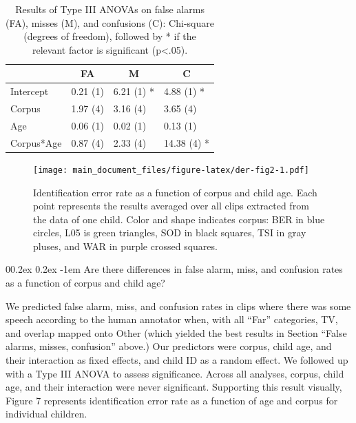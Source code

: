 \documentclass[english,table,man,floatsintext]{apa6}
\makeatletter
\let\oldparagraph\paragraph
\renewcommand{\paragraph}[1]{\oldparagraph{#1}\mbox{}}
\renewcommand{\paragraph}{\@startsection{paragraph}{4}{\parindent}%
  {0\baselineskip \@plus 0.2ex \@minus 0.2ex}%
  {-1em}%
  {\normalfont\normalsize\bfseries\itshape\typesectitle}}
\makeatother
\begin{document}
\begin{table}[tbp]

\begin{center}
\begin{threeparttable}

\caption{\label{tab:anovatab}Results of Type III ANOVAs on false alarms (FA), misses (M), and confusions (C): Chi-square (degrees of freedom), followed by * if the relevant factor is significant (p<.05).}

\begin{tabular}{llll}
\toprule
 & \multicolumn{1}{c}{FA} & \multicolumn{1}{c}{M} & \multicolumn{1}{c}{C}\\
\midrule
Intercept & 0.21 (1) & 6.21 (1) * & 4.88 (1) *\\
Corpus & 1.97 (4) & 3.16 (4) & 3.65 (4)\\
Age & 0.06 (1) & 0.02 (1) & 0.13 (1)\\
Corpus*Age & 0.87 (4) & 2.33 (4) & 14.38 (4) *\\
\bottomrule
\end{tabular}

\end{threeparttable}
\end{center}

\end{table}

\begin{figure}
\centering
\texttt{[image: main\_document\_files/figure-latex/der-fig2-1.pdf]}
\caption{\label{fig:der-fig2}Identification error rate as a function of corpus and child age. Each point represents the results averaged over all clips extracted from the data of one child. Color and shape indicates corpus: BER in blue circles, L05 is green triangles, SOD in black squares, TSI in gray pluses, and WAR in purple crossed squares.}
\end{figure}

\hypertarget{are-there-differences-in-false-alarm-miss-and-confusion-rates-as-a-function-of-corpus-and-child-age}{%
\paragraph{Are there differences in false alarm, miss, and confusion rates as a function of corpus and child age?}\label{are-there-differences-in-false-alarm-miss-and-confusion-rates-as-a-function-of-corpus-and-child-age}}

We predicted false alarm, miss, and confusion rates in clips where there was some speech according to the human annotator when, with all \enquote{Far} categories, TV, and overlap mapped onto Other (which yielded the best results in Section \enquote{False alarms, misses, confusion} above.) Our predictors were corpus, child age, and their interaction as fixed effects, and child ID as a random effect. We followed up with a Type III ANOVA to assess significance. Across all analyses, corpus, child age, and their interaction were never significant. Supporting this result visually, Figure 7 represents identification error rate as a function of age and corpus for individual children.
\end{document}
